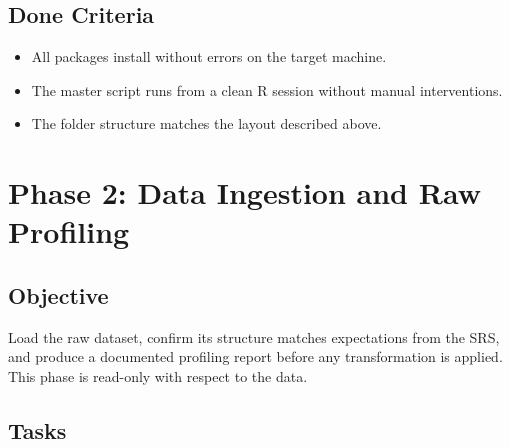 \documentclass[11pt]{article}
\begin{document}
\subsection{Done Criteria}

\begin{itemize}
  \item All packages install without errors on the target machine.
  \item The master script runs from a clean R session without manual interventions.
  \item The folder structure matches the layout described above.
\end{itemize}

\newpage
\section{Phase 2: Data Ingestion and Raw Profiling}

\subsection{Objective}

Load the raw dataset, confirm its structure matches expectations from the SRS, and produce a documented profiling report before any transformation is applied. This phase is read-only with respect to the data.

\subsection{Tasks}
\end{document}
